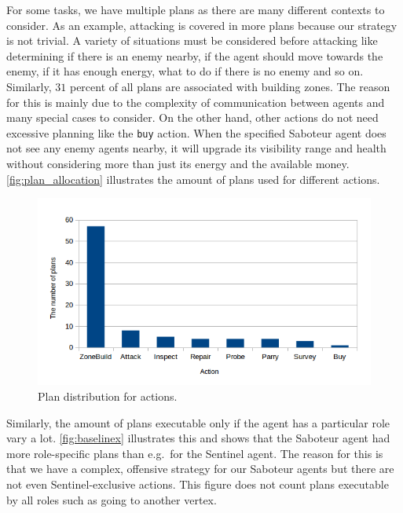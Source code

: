 For some tasks, we have multiple plans as there are many different contexts to consider.
As an example, attacking is covered in more plans because our strategy is not trivial.
A variety of situations must be considered before attacking like determining if there is an enemy nearby, if the agent should move towards the enemy, if it has enough energy, what to do if there is no enemy and so on.
Similarly, $31$ percent of all plans are associated with building zones.
The reason for this is mainly due to the complexity of communication between agents and many special cases to consider.
On the other hand, other actions do not need excessive planning like the \texttt{buy} action.
When the specified Saboteur agent does not see any enemy agents nearby, it will upgrade its visibility range and health without considering more than just its energy and the available money.
\autoref{fig:plan_allocation} illustrates the amount of plans used for different actions.
\begin{figure}
  \centering
  \includegraphics[width=\textwidth]{images/BDI_plan_distribution_action}
  \caption{Plan distribution for actions.}
  \label{fig:plan_allocation}
\end{figure}
Similarly, the amount of plans executable only if the agent has a particular role vary a lot.
\autoref{fig:baselinex} illustrates this and shows that the Saboteur agent had more role-specific plans than e.g.\ for the Sentinel agent.
The reason for this is that we have a complex, offensive strategy for our Saboteur agents but there are not even Sentinel-exclusive actions.
This figure does not count plans executable by all roles such as going to another vertex.
